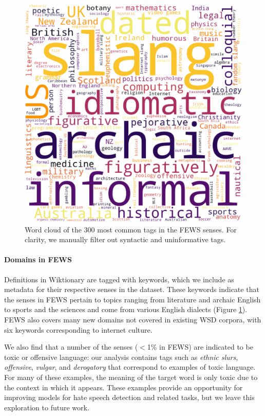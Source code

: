 \documentclass[11pt,a4paper]{article}
\begin{document}
\begin{figure}[b!]
\centering
\includegraphics[width=0.7\linewidth]{figures/domain-wc.pdf}
\caption{Word cloud of the 300 most common tags in the FEWS senses. For clarity, we manually filter out syntactic and uninformative tags.}
\label{domain-wc}
\end{figure}


\paragraph{Domains in FEWS} Definitions in Wiktionary are tagged with keywords, which we include as metadata for their respective senses in the dataset. These keywords indicate that the senses in FEWS pertain to topics ranging from literature and archaic English to sports and the sciences and come from various English dialects (Figure \ref{domain-wc}). FEWS also covers many new domains not covered in existing WSD corpora, with six keywords corresponding to internet culture.

We also find that a number of the senses ($<$1\% in FEWS) are indicated to be toxic or offensive language: our analysis contains tags such as \textit{ethnic slurs}, \textit{offensive}, \textit{vulgar}, and \textit{derogatory} that correspond to examples of toxic language. For many of these examples, the meaning of the target word is only toxic due to the context in which it appears. These examples provide an opportunity for improving models for hate speech detection and related tasks, but we leave this exploration to future work.
\end{document}
